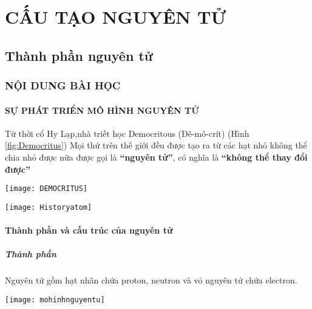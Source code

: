 \chapter{CẤU TẠO NGUYÊN TỬ}
\section{Thành phần nguyên tử}
\subsection{NỘI DUNG BÀI HỌC}
\subsubsection{SỰ PHÁT TRIỂN MÔ HÌNH NGUYÊN TỬ}
\begin{hoplythuyet}
\begin{minipage}[htp!]{0.5\textwidth}
Từ thời cổ Hy Lạp,nhà triết học Democritous (Đê-mô-crít) (Hình \ref{fig:Democritus})
Mọi thứ trên thế giới đều được tạo ra từ các hạt nhỏ không thể chia nhỏ được nữa được gọi là \textbf{“nguyên tử”}, có nghĩa là \textbf{“không thể thay đổi được”}
\end{minipage}
\begin{minipage}[htp!]{0.5\textwidth}
\begin{center}
		\texttt{[image: DEMOCRITUS]}
\end{center}
\end{minipage}

\begin{center}
	\texttt{[image: Historyatom]}
\end{center}
\end{hoplythuyet}
\subsubsection{Thành phần và cấu trúc của nguyên tử}
\paragraph{Thành phần}
\begin{hoplythuyet}
	Nguyên tử gồm hạt nhân chứa proton, neutron và vỏ nguyên tử chứa electron.
	\begin{center}
		\texttt{[image: mohinhnguyentu]}
	\end{center}
\end{hoplythuyet}
